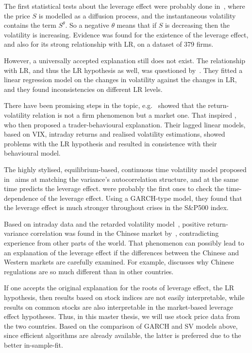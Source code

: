 The first statistical tests about the leverage effect were probably done in~\citet{Christie1982}, where the price $S$ is modelled as a diffusion process, and the instantaneous volatility contains the term $S^\theta$.
So a negative $\theta$ means that if $S$ is decreasing then the volatility is increasing.
Evidence was found for the existence of the leverage effect, and also for its strong relationship with LR, on a dataset of 379 firms.

However, a universally accepted explanation still does not exist.
The relationship with LR, and thus the LR hypothesis as well, was questioned by~\citet{figlewski2000leverage}.
They fitted a linear regression model on the changes in volatility against the changes in LR, and they found inconsistencies on different LR levels.

There have been promising steps in the topic, e.g.~\citet{dennis2006stock} showed that the return-volatility relation is not a firm phenomenon but a market one.
That inspired \citet{Hibbert2008}, who then proposed a trader-behavioural explanation.
Their lagged linear models, based on VIX, intraday returns and realised volatility estimations, showed problems with the LR hypothesis and resulted in consistence with their behavioural model.

The highly stylised, equilibrium-based, continuous time volatility model proposed in~\citet{bollerslev2011volatility} aims at matching the variance's autocorrelation structure, and at the same time predicts the leverage effect.
\citet{Christensen2015} were probably the first ones to check the time-dependence of the leverage effect.
Using a GARCH-type model, they found that the leverage effect is much stronger throughout crises in the S\&P500 index.

Based on intraday data and the retarded volatility model~\citep{Bouchaud2001}, positive return-variance correlation was found in the Chinese market by~\citet{Shen2009}, contradicting experience from other parts of the world.
That phenomenon can possibly lead to an explanation of the leverage effect if the differences between the Chinese and Western markets are carefully examined.
For example, \citet{GORDON2003} discusses why Chinese regulations are so much different than in other countries.

If one accepts the original explanation for the roots of leverage effect, the LR hypothesis, then results based on stock indices are not easily interpretable, while results on common stocks are also interpretable in the market-based leverage effect hypotheses.
Thus, in this master thesis, we will use stock price data from the two countries.
Based on the comparison of GARCH and SV models above, since efficient algorithms are already available, the latter is preferred due to the better in-sample-fit.
